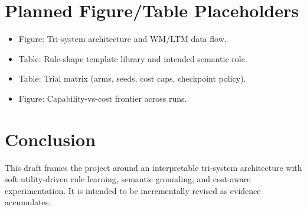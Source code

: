 \documentclass[14pt]{article}
\begin{document}
\section{Planned Figure/Table Placeholders}
\begin{itemize}[leftmargin=1.5em]
  \item Figure: Tri-system architecture and WM/LTM data flow.
  \item Table: Rule-shape template library and intended semantic role.
  \item Table: Trial matrix (arms, seeds, cost caps, checkpoint policy).
  \item Figure: Capability-vs-cost frontier across runs.
\end{itemize}

\section{Conclusion}
This draft frames the project around an interpretable tri-system architecture with soft utility-driven rule learning,
semantic grounding, and cost-aware experimentation.
It is intended to be incrementally revised as evidence accumulates.
\end{document}
